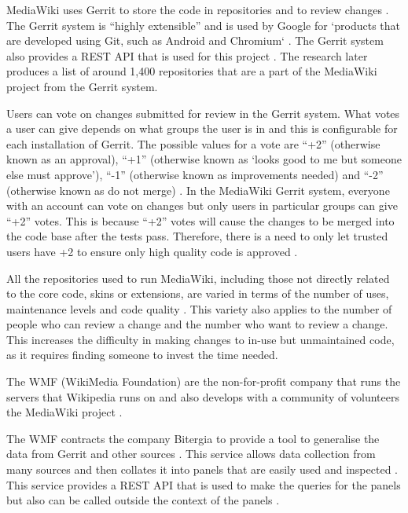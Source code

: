 MediaWiki uses Gerrit to store the code in repositories and to review changes . The Gerrit system is \enquote{highly extensible} and is used by Google for `products that are developed using Git, such as Android and Chromium` \citep{google:gerrit}. The Gerrit system also provides a REST API that is used for this project \citep{mediawiki-gerrit:rest-api-docs}. The research later produces a list of around 1,400 repositories that are a part of the MediaWiki project from the Gerrit system.

Users can vote on changes submitted for review in the Gerrit system. What votes a user can give depends on what groups the user is in and this is configurable for each installation of Gerrit. The possible values for a vote are ``+2'' (otherwise known as an approval), ``+1'' (otherwise known as `looks good to me but someone else must approve'), ``-1'' (otherwise known as improvements needed) and ``-2'' (otherwise known as do not merge) \citep{gerrit:documentation-review-labels}. In the MediaWiki Gerrit system, everyone with an account can vote on changes but only users in particular groups can give ``+2'' votes. This is because ``+2'' votes will cause the changes to be merged into the code base after the tests pass. Therefore, there is a need to only let trusted users have +2 to ensure only high quality code is approved  .

All the repositories used to run MediaWiki, including those not directly related to the core code, skins or extensions, are varied in terms of the number of uses, maintenance levels and code quality . This variety also applies to the number of people who can review a change and the number who want to review a change. This increases the difficulty in making changes to in-use but unmaintained code, as it requires finding someone to invest the time needed.

The WMF (WikiMedia Foundation) are the non-for-profit company that runs the servers that Wikipedia runs on \citep{WikiMediaFoundationAbout} and also develops with a community of volunteers the MediaWiki project .

The WMF contracts the company Bitergia to provide a tool to generalise the data from Gerrit and other sources . This service allows data collection from many sources and then collates it into panels that are easily used and inspected \citep{bitergia-analytics}. This service provides a REST API that is used to make the queries for the panels but also can be called outside the context of the panels .

